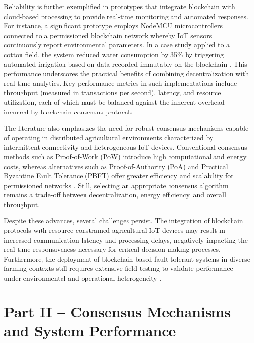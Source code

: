 \documentclass[12pt,onecolumn]{IEEEtran} %
\begin{document}
Reliability is further exemplified in prototypes that integrate blockchain with cloud-based processing to provide real-time monitoring and automated responses. For instance, a significant prototype employs NodeMCU microcontrollers connected to a permissioned blockchain network whereby IoT sensors continuously report environmental parameters. In a case study applied to a cotton field, the system reduced water consumption by 35\% by triggering automated irrigation based on data recorded immutably on the blockchain \cite{shahzad2025decentralizediotbasedarchitectures}. This performance underscores the practical benefits of combining decentralization with real-time analytics. Key performance metrics in such implementations include throughput (measured in transactions per second), latency, and resource utilization, each of which must be balanced against the inherent overhead incurred by blockchain consensus protocols.

The literature also emphasizes the need for robust consensus mechanisms capable of operating in distributed agricultural environments characterized by intermittent connectivity and heterogeneous IoT devices. Conventional consensus methods such as Proof-of-Work (PoW) introduce high computational and energy costs, whereas alternatives such as Proof-of-Authority (PoA) and Practical Byzantine Fault Tolerance (PBFT) offer greater efficiency and scalability for permissioned networks \cite{soy2025blockchainintegrationin}. Still, selecting an appropriate consensus algorithm remains a trade-off between decentralization, energy efficiency, and overall throughput.

Despite these advances, several challenges persist. The integration of blockchain protocols with resource-constrained agricultural IoT devices may result in increased communication latency and processing delays, negatively impacting the real-time responsiveness necessary for critical decision-making processes. Furthermore, the deployment of blockchain-based fault-tolerant systems in diverse farming contexts still requires extensive field testing to validate performance under environmental and operational heterogeneity \cite{shahzad2025decentralizediotbasedarchitectures}.


\part*{Part II – Consensus Mechanisms and System Performance}
\end{document}
